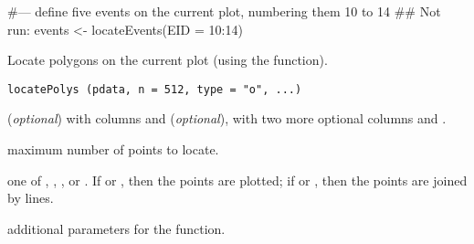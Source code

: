 \documentclass[letterpaper]{book}
\begin{document}
%
\begin{Examples}
\begin{ExampleCode}
#--- define five events on the current plot, numbering them 10 to 14
## Not run: events <- locateEvents(EID = 10:14)
\end{ExampleCode}
\end{Examples}
%
\begin{Description}\relax
Locate polygons on the current plot (using the 
function).
\end{Description}
%
\begin{Usage}
\begin{verbatim}
locatePolys (pdata, n = 512, type = "o", ...)
\end{verbatim}
\end{Usage}
%
\begin{Arguments}
\begin{ldescription}
\item[\code{pdata}]  (\emph{optional}) with
columns  and  (\emph{optional}), with two more
optional columns  and .
\item[\code{n}] maximum number of points to locate.
\item[\code{type}] one of , , , or
. If  or , then the points are
plotted; if   or , then the points are joined by
lines.
\item[\code{...}] additional  parameters for the
 function.
\end{ldescription}
\end{Arguments}
%
\end{document}
